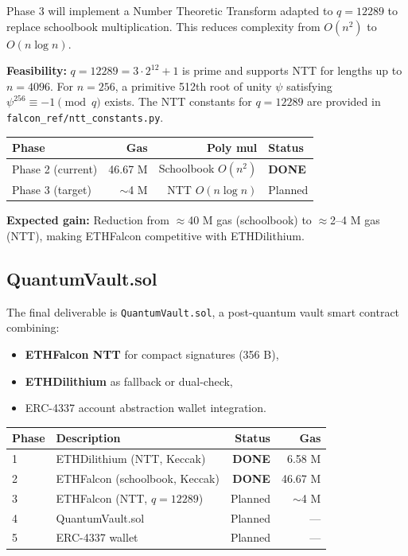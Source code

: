 \documentclass[11pt,a4paper]{article}
\begin{document}
Phase 3 will implement a Number Theoretic Transform adapted to $q=12289$
to replace schoolbook multiplication. This reduces complexity from $O(n^2)$
to $O(n\log n)$.

\textbf{Feasibility:} $q = 12289 = 3 \cdot 2^{12} + 1$ is prime and supports
NTT for lengths up to $n = 4096$. For $n=256$, a primitive 512th root of unity
$\psi$ satisfying $\psi^{256} \equiv -1 \pmod{q}$ exists.
The NTT constants for $q=12289$ are provided in \texttt{falcon\_ref/ntt\_constants.py}.

\begin{center}
\begin{tabular}{lrrl}
\toprule
\textbf{Phase} & \textbf{Gas} & \textbf{Poly mul} & \textbf{Status} \\
\midrule
Phase 2 (current) & 46.67 M & Schoolbook $O(n^2)$ & \textcolor{pass-green}{\textbf{DONE}} \\
Phase 3 (target)  & $\sim$4 M  & NTT $O(n\log n)$    & Planned \\
\bottomrule
\end{tabular}
\end{center}

\textbf{Expected gain:} Reduction from $\approx$40 M gas (schoolbook)
to $\approx$2--4 M gas (NTT), making ETHFalcon competitive with ETHDilithium.

\subsection{QuantumVault.sol}

The final deliverable is \texttt{QuantumVault.sol}, a post-quantum vault
smart contract combining:
\begin{itemize}
  \item \textbf{ETHFalcon NTT} for compact signatures (356 B),
  \item \textbf{ETHDilithium} as fallback or dual-check,
  \item ERC-4337 account abstraction wallet integration.
\end{itemize}

\begin{center}
\begin{tabular}{llrr}
\toprule
\textbf{Phase} & \textbf{Description} & \textbf{Status} & \textbf{Gas} \\
\midrule
1 & ETHDilithium (NTT, Keccak)       & \textcolor{pass-green}{\textbf{DONE}} & 6.58 M \\
2 & ETHFalcon (schoolbook, Keccak)   & \textcolor{pass-green}{\textbf{DONE}} & 46.67 M \\
3 & ETHFalcon (NTT, $q=12289$)       & Planned & $\sim$4 M \\
4 & QuantumVault.sol                 & Planned & --- \\
5 & ERC-4337 wallet                  & Planned & --- \\
\bottomrule
\end{tabular}
\end{center}
\end{document}
